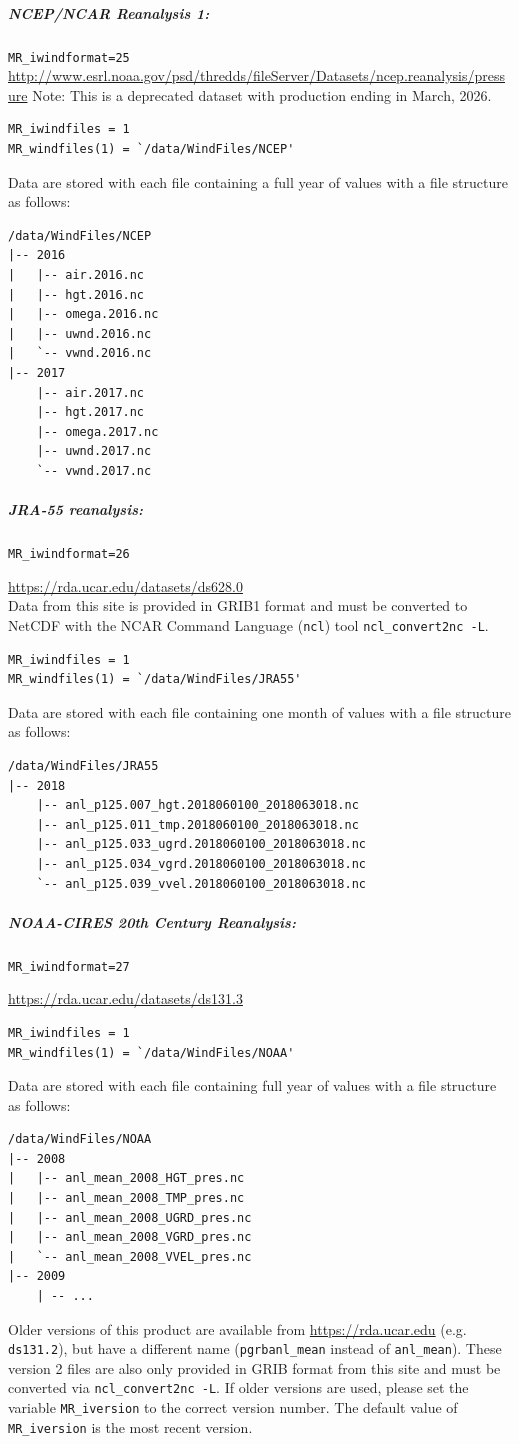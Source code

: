 \documentclass[11pt]{article}   %
\begin{document}
\subparagraph{NCEP/NCAR Reanalysis 1:}
\texttt{MR\_iwindformat=25}
\url{http://www.esrl.noaa.gov/psd/thredds/fileServer/Datasets/ncep.reanalysis/pressure}
Note: This is a deprecated dataset with production ending in March, 2026.
\begin{verbatim}
MR_iwindfiles = 1
MR_windfiles(1) = `/data/WindFiles/NCEP'
\end{verbatim}
Data are stored with each file containing a full year of values with a file structure as follows:
\begin{verbatim}
/data/WindFiles/NCEP
|-- 2016
|   |-- air.2016.nc
|   |-- hgt.2016.nc
|   |-- omega.2016.nc
|   |-- uwnd.2016.nc
|   `-- vwnd.2016.nc
|-- 2017
    |-- air.2017.nc
    |-- hgt.2017.nc
    |-- omega.2017.nc
    |-- uwnd.2017.nc
    `-- vwnd.2017.nc
\end{verbatim}

\subparagraph{JRA-55 reanalysis:}
\texttt{MR\_iwindformat=26}

\url{https://rda.ucar.edu/datasets/ds628.0}\\
Data from this site is provided in GRIB1 format and must be converted to NetCDF
with the NCAR Command Language (\texttt{ncl}) tool \texttt{ncl\_convert2nc -L}.
\begin{verbatim}
MR_iwindfiles = 1
MR_windfiles(1) = `/data/WindFiles/JRA55'
\end{verbatim}
Data are stored with each file containing one month of values with a file structure as follows:
\begin{verbatim}
/data/WindFiles/JRA55
|-- 2018
    |-- anl_p125.007_hgt.2018060100_2018063018.nc
    |-- anl_p125.011_tmp.2018060100_2018063018.nc
    |-- anl_p125.033_ugrd.2018060100_2018063018.nc
    |-- anl_p125.034_vgrd.2018060100_2018063018.nc
    `-- anl_p125.039_vvel.2018060100_2018063018.nc
\end{verbatim}

\subparagraph{NOAA-CIRES 20th Century Reanalysis:}
\texttt{MR\_iwindformat=27}

\url{https://rda.ucar.edu/datasets/ds131.3}
\begin{verbatim}
MR_iwindfiles = 1
MR_windfiles(1) = `/data/WindFiles/NOAA'
\end{verbatim}
Data are stored with each file containing full year of values with a file structure as follows:
\begin{verbatim}
/data/WindFiles/NOAA
|-- 2008
|   |-- anl_mean_2008_HGT_pres.nc
|   |-- anl_mean_2008_TMP_pres.nc
|   |-- anl_mean_2008_UGRD_pres.nc
|   |-- anl_mean_2008_VGRD_pres.nc
|   `-- anl_mean_2008_VVEL_pres.nc
|-- 2009
    | -- ...
\end{verbatim}
Older versions of this product are available from \url{https://rda.ucar.edu} (e.g. \texttt{ds131.2}),
but have a different name (\texttt{pgrbanl\_mean} instead of \texttt{anl\_mean}). These version 2
files are also only provided in GRIB format from this site and must be converted via \texttt{ncl\_convert2nc -L}.
If older versions are used, please set the variable \texttt{MR\_iversion} to the correct version number.
The default value of \texttt{MR\_iversion} is the most recent version.
\end{document}
